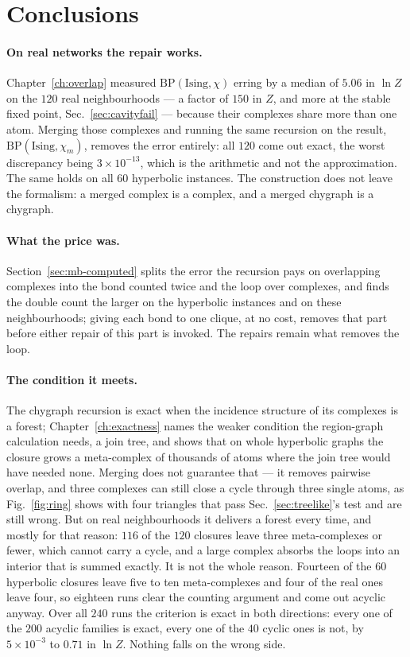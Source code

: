 \section{Conclusions}
\label{sec:part4-conclusions}

\paragraph{On real networks the repair works.} Chapter~\ref{ch:overlap}
measured $\mathrm{BP}(\mathrm{Ising},\chi)$ erring by a median of $5.06$ in
$\ln Z$ on the $120$ real neighbourhoods --- a factor of $150$ in $Z$, and
more at the stable fixed point, Sec.~\ref{sec:cavityfail} --- because their
complexes share more than one atom. Merging those complexes and
running the same recursion on the result, $\mathrm{BP}(\mathrm{Ising},\chi_{m})$,
removes the error entirely: all $120$ come out exact, the worst
discrepancy being $3\times10^{-13}$, which is the arithmetic and not the
approximation. The same holds on all $60$ hyperbolic instances. The construction
does not leave the formalism: a merged complex is a complex, and a merged
chygraph is a chygraph.

\paragraph{What the price was.} Section~\ref{sec:mb-computed} splits the
error the recursion pays on overlapping complexes into the bond counted
twice and the loop over complexes, and finds the double count the larger
on the hyperbolic instances and on these neighbourhoods; giving each bond
to one clique, at no cost, removes that part before either repair of this
part is invoked. The repairs remain what removes the loop.

\paragraph{The condition it meets.} The chygraph recursion is exact when the
incidence structure of its complexes is a forest; Chapter~\ref{ch:exactness}
names the weaker condition the region-graph calculation needs, a join tree,
and shows that on whole hyperbolic graphs the closure grows a meta-complex
of thousands of atoms where the join tree would have needed none.
Merging does not guarantee that --- it removes pairwise overlap, and three
complexes can still close a cycle through three single atoms, as
Fig.~\ref{fig:ring} shows with four triangles that pass Sec.~\ref{sec:treelike}'s
test and are still wrong. But on real neighbourhoods it delivers a forest every
time, and mostly for that reason: $116$ of the $120$ closures leave three
meta-complexes or fewer, which cannot carry a cycle, and a large complex absorbs
the loops into an interior that is summed exactly. It is not the whole reason.
Fourteen of the $60$ hyperbolic closures leave five to ten meta-complexes and
four of the real ones leave four, so eighteen runs clear the counting argument
and come out acyclic anyway. Over all $240$ runs the criterion is exact in both directions: every one
of the $200$ acyclic families is exact, every one of the $40$ cyclic ones is
not, by $5\times10^{-3}$ to $0.71$ in $\ln Z$. Nothing falls on the wrong side.

